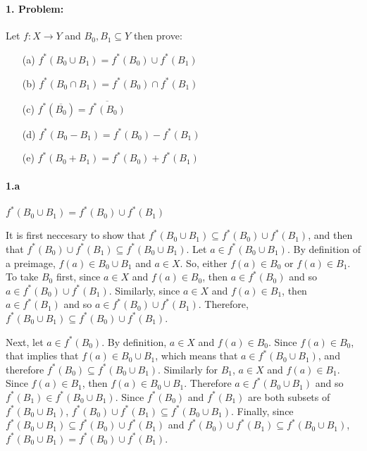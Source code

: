 \documentclass[12pt, letterpaper]{article}
\begin{document}
 \\

\paragraph{1. Problem:} Let \( f:X \rightarrow Y\) and \(B_0, B_1 \subseteq Y\) then prove:
\begin{enumerate}
	\item[(a)] \(f^*(B_0 \cup B_1) = f^*(B_0) \cup f^*(B_1)\)
	\item[(b)] \(f^*(B_0 \cap B_1) = f^*(B_0) \cap f^*(B_1)\)
	\item[(c)] \(f^*(\overline{B_0}) = \overline{f^*(B_0)}\) 
	\item[(d)] \(f^*(B_0 - B_1) = f^*(B_0) - f^*(B_1)\)
	\item[(e)] \(f^*(B_0 + B_1) = f^*(B_0) + f^*(B_1)\)
\end{enumerate}


\paragraph{1.a}\(f^*(B_0 \cup B_1) = f^*(B_0) \cup f^*(B_1)\)

It is first neccesary to show that \(f^*(B_0 \cup B_1) \subseteq f^*(B_0) \cup f^*(B_1)\), and then that \(f^*(B_0) \cup f^*(B_1) \subseteq f^*(B_0 \cup B_1) \). Let \(a \in f^*(B_0 \cup B_1) \).  By definition of a preimage, \(f(a) \in B_0 \cup B_1\) and \(a \in X\). So, either \(f(a) \in B_0\) or \(f(a) \in B_1\). To take \(B_0\) first, since \(a \in X\) and \(f(a) \in B_0\), then  \(a \in f^*(B_0)\)  and so \(a \in f^*(B_0) \cup f^*(B_1)\). Similarly, since \(a \in X\) and \(f(a) \in B_1\), then  \(a \in f^*(B_1)\) and so \(a \in f^*(B_0) \cup f^*( B_1)\). Therefore, \(f^*(B_0 \cup B_1) \subseteq f^*(B_0) \cup f^*(B_1)\).

Next, let \(a \in f^*(B_0)\). By definition, \(a \in X\) and \(f(a) \in B_0\). Since \(f(a) \in B_0\), that implies that \(f(a) \in B_0 \cup B_1\), which means that \(a \in f^*(B_0 \cup B_1)\), and therefore \(f^*(B_0) \subseteq f^*(B_0 \cup B_1)\).  Similarly for \(B_1\), \(a \in X\) and \(f(a) \in B_1\). Since \(f(a) \in B_1\), then \(f(a) \in B_0 \cup B_1\). Therefore \(a \in f^*(B_0 \cup B_1)\) and so \(f^*(B_1) \in f^*(B_0 \cup B_1)\).  Since \(f^*(B_0)\) and \(f^*(B_1)\) are both subsets of \(f^*(B_0 \cup B_1)\), \(f^*(B_0) \cup f^*(B_1) \subseteq f^*(B_0 \cup B_1) \). Finally, since \(f^*(B_0 \cup B_1) \subseteq f^*(B_0) \cup f^*(B_1)\) and \(f^*(B_0) \cup f^*(B_1) \subseteq f^*(B_0 \cup B_1) \), \(f^*(B_0 \cup B_1) = f^*(B_0) \cup f^*(B_1)\).
\end{document}
